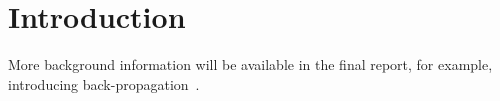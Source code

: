 \section{Introduction}
More background information will be available in the final report,
for example, introducing back-propagation~\cite{Backpropagation}.
